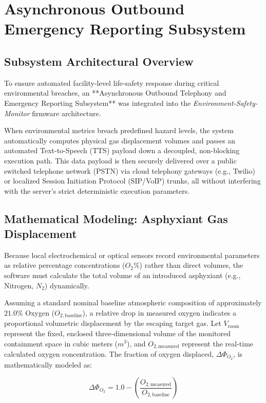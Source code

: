 \documentclass[../master.tex]{subfiles}
\begin{document}
\chapter{Asynchronous Outbound Emergency Reporting Subsystem}
\label{ch:emergency_reporting}

\section{Subsystem Architectural Overview}
To ensure automated facility-level life-safety response during critical environmental breaches, an **Asynchronous Outbound Telephony and Emergency Reporting Subsystem** was integrated into the \textit{Environment-Safety-Monitor} firmware architecture. 

When environmental metrics breach predefined hazard levels, the system automatically computes physical gas displacement volumes and passes an automated Text-to-Speech (TTS) payload down a decoupled, non-blocking execution path. This data payload is then securely delivered over a public switched telephone network (PSTN) via cloud telephony gateways (e.g., Twilio) or localized Session Initiation Protocol (SIP/VoIP) trunks, all without interfering with the server's strict deterministic execution parameters.

\section{Mathematical Modeling: Asphyxiant Gas Displacement}
Because local electrochemical or optical sensors record environmental parameters as relative percentage concentrations ($O_2\%$) rather than direct volumes, the software must calculate the total volume of an introduced asphyxiant (e.g., Nitrogen, $N_2$) dynamically. 

Assuming a standard nominal baseline atmospheric composition of approximately $21.0\%$ Oxygen ($O_{2,\text{baseline}}$), a relative drop in measured oxygen indicates a proportional volumetric displacement by the escaping target gas. Let $V_{\text{room}}$ represent the fixed, enclosed three-dimensional volume of the monitored containment space in cubic meters ($m^3$), and $O_{2,\text{measured}}$ represent the real-time calculated oxygen concentration. The fraction of oxygen displaced, $\Delta\Phi_{O_2}$, is mathematically modeled as:

\begin{equation}
    \Delta\Phi_{O_2} = 1.0 - \left( \frac{O_{2,\text{measured}}}{O_{2,\text{baseline}}} \right)
\end{equation}
\end{document}
